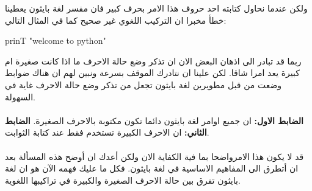 ولكن عندما نحاول كتابته احد حروف هذا الامر بحرف كبير فان مفسر لغة بايثون يعطينا خطأ مخبرا ان التركيب اللغوي غير صحيح كما في المثال التالي:
\begin{english}
\begin{tcolorbox}
\begin{pyconsole}
prinT "welcome to python"
\end{pyconsole}
\end{tcolorbox}
\end{english}
ربما قد تبادر الى اذهان البعض الان ان تذكر وضع حالة الاحرف ما اذا كانت صغيرة ام كبيرة  يعد امرا شاقا. لكن علينا ان نتادرك الموقف بسرعة ونبين لهم ان هناك ضوابط وضعت من قبل مطويرين لغة بايثون تجعل من تذكر وضع حالة الاحرف غاية في السهولة.
\\
\\
\textbf{الضابط الاول:}
 ان جميع اوامر لغة بايثون دائما تكون مكتوبة بالاحرف الصغيرة. 
\textbf{الضابط الثاني:}
 ان الاحرف الكبيرة  تستخدم فقط عند كتابة الثوابت. 
 \\
 \\
 قد لا يكون هذا الامرواضحا بما فية الكفاية الان ولكن أعدك ان أوضح هذه المسألة بعد ان أتطرق الى المفاهيم  الاساسية في لغة بايثون. فكل ما عليك فهمه الآن هو ان لغة بايثون تفرق بين حالة الاحرف الصغيرة والكبيرة في تراكيبها اللغوية.
\\
